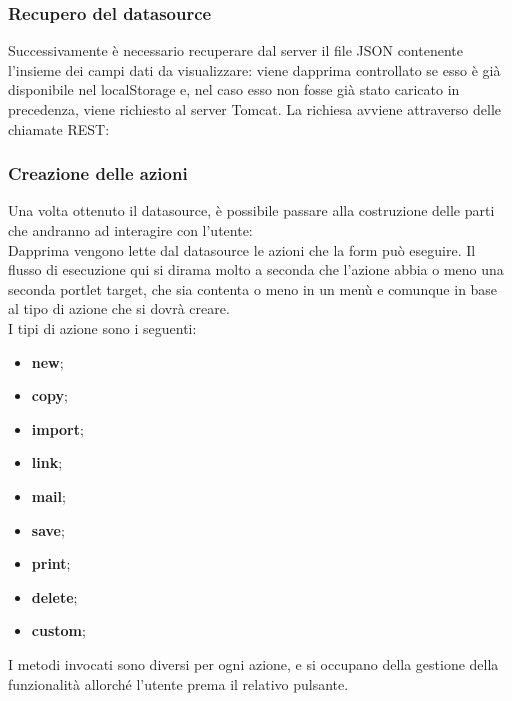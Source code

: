 \subsubsection{Recupero del datasource}
Successivamente è necessario recuperare dal server il file JSON contenente l'insieme dei campi dati da visualizzare: viene dapprima controllato se esso è già disponibile nel localStorage e, nel caso esso non fosse già stato caricato in precedenza, viene richiesto al server Tomcat.
La richiesa avviene attraverso delle chiamate REST: %
\subsubsection{Creazione delle azioni}
Una volta ottenuto il datasource, è possibile passare alla costruzione delle parti che andranno ad interagire con l'utente:\\
Dapprima vengono lette dal datasource le azioni che la form può eseguire. Il flusso di esecuzione qui si dirama molto a seconda che l'azione abbia o meno una seconda portlet target, che sia contenta o meno in un menù e comunque in base al tipo di azione che si dovrà creare.\\
I tipi di azione sono i seguenti:
\begin{itemize}
	\item \textbf{new};
	\item \textbf{copy};
	\item \textbf{import};
	\item \textbf{link};
	\item \textbf{mail};
	\item \textbf{save};
	\item \textbf{print};
	\item \textbf{delete};
	\item \textbf{custom};
\end{itemize}
I metodi invocati sono diversi per ogni azione, e si occupano della gestione della funzionalità allorché l'utente prema il relativo pulsante.
